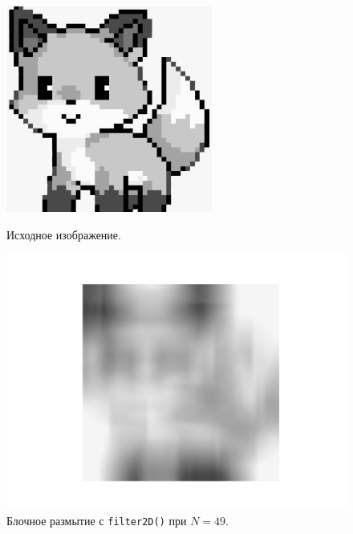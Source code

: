 \documentclass[a4paper]{article}
\begin{document}
\begin{figure}[H]
  \centering
  \begin{minipage}{0.49\textwidth}
    \centering
    \includegraphics[width=\textwidth]{src/grayscale.png}
    \caption{Исходное изображение.}  
  \end{minipage}
  \begin{minipage}{0.49\textwidth}
    \centering
    \includegraphics[width=\textwidth]{src/box_49.png}
    \caption{Блочное размытие с \texttt{filter2D()} при $N=49$.}
  \end{minipage}
\end{figure}
\end{document}
